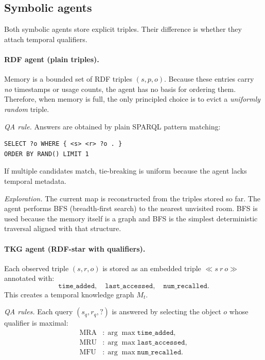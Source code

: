 \documentclass[11pt]{article}
\begin{document}
\subsection{Symbolic agents}

Both symbolic agents store explicit triples. Their difference is whether
they attach temporal qualifiers.

\paragraph{RDF agent (plain triples).}
Memory is a bounded set of RDF triples $(s,p,o)$.
Because these entries carry \emph{no} timestamps or usage counts, the
agent has no basis for ordering them. Therefore, when memory is full, the
only principled choice is to evict a \emph{uniformly random} triple.

\emph{QA rule.} Answers are obtained by plain SPARQL pattern matching:
\begin{lstlisting}[language=SPARQL,basicstyle=\ttfamily\small,frame=single]
SELECT ?o WHERE { <s> <r> ?o . }
ORDER BY RAND() LIMIT 1
\end{lstlisting}
If multiple candidates match, tie-breaking is uniform because the agent
lacks temporal metadata.

\emph{Exploration.}
The current map is reconstructed from the triples stored so far.
The agent performs BFS (breadth-first search) to the nearest unvisited room. BFS is used because the memory itself is a graph and BFS is the simplest deterministic
traversal aligned with that structure.

\paragraph{TKG agent (RDF-star with qualifiers).}
Each observed triple $(s,r,o)$ is stored as an embedded triple
$\ll s\ r\ o\gg$ annotated with:
\[
\texttt{time\_added},\quad \texttt{last\_accessed},\quad
\texttt{num\_recalled}.
\]
This creates a temporal knowledge graph $M_t$.

\emph{QA rules.}  
Each query $(s_q,r_q,?)$ is answered by selecting the object $o$ whose
qualifier is maximal:
\[
\begin{aligned}
\text{MRA} &: \arg\max \texttt{time\_added},\\
\text{MRU} &: \arg\max \texttt{last\_accessed},\\
\text{MFU} &: \arg\max \texttt{num\_recalled}.
\end{aligned}
\]
\end{document}

